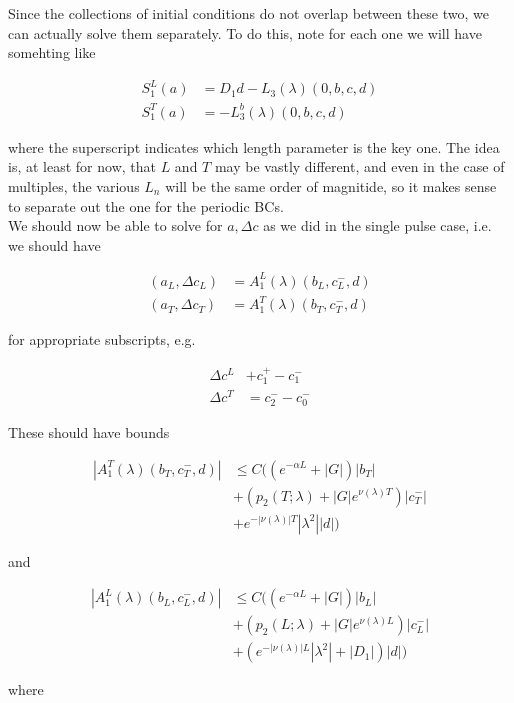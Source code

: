 \documentclass[12pt]{article}
\begin{document}
\begin{enumerate}
Since the collections of initial conditions do not overlap between these two, we can actually solve them separately. To do this, note for each one we will have somehting like

\begin{align*}
S_1^L(a) &= D_1 d - L_3(\lambda)(0, b, c, d) \\
S_1^T(a) &= - L_3^b(\lambda) (0, b, c, d)
\end{align*}

where the superscript indicates which length parameter is the key one. The idea is, at least for now, that $L$ and $T$ may be vastly different, and even in the case of multiples, the various $L_n$ will be the same order of magnitide, so it makes sense to separate out the one for the periodic BCs.\\

We should now be able to solve for $a, \Delta c$ as we did in the single pulse case, i.e. we should have 

\begin{align*}
(a_{L}, \Delta c_{L}) &= A_1^{L}(\lambda)(b_{L}, c_{L}^-,d) \\
(a_{T}, \Delta c_{T}) &= A_1^{T}(\lambda)(b_{T}, c_{T}^-,d) 
\end{align*}

for appropriate subscripts, e.g.

\begin{align*}
\Delta c^L &+ c_1^+ - c_1^- \\
\Delta c^T &= c_2^- - c_0^-
\end{align*}

 These should have bounds

\begin{align*}
|A_1^T(\lambda)(b_T, c_T^-, d)| &\leq C ( (e^{-\alpha L} + |G|)|b_T| \\
&+ ( p_2(T; \lambda) + |G|e^{\nu(\lambda)T})|c_T^-| \\
&+ e^{-|\nu(\lambda)|T} |\lambda^2||d|)
\end{align*}

and

\begin{align*}
|A_1^L(\lambda)(b_L, c_L^-, d)| &\leq C ( ( e^{-\alpha L} + |G|)|b_L| \\
&+ ( p_2(L; \lambda) + |G|e^{\nu(\lambda)L})|c_L^-| \\
&+ (e^{-|\nu(\lambda)|L}|\lambda^2| + |D_1|)|d|)
\end{align*}

where


\end{enumerate}
\end{document}
